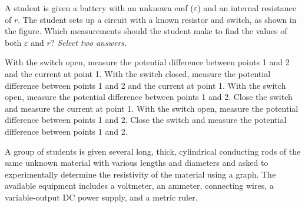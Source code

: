 \documentclass{../../oss-apphys-exam}
\begin{document}
\begin{questions}
  \question A student is given a battery with an unknown emf ($\varepsilon$)
  and an internal resistance of $r$. The student sets up a circuit with a known
  resistor and switch, as shown in the figure. Which measurements should the
  student make to find the values of both $\varepsilon$ and $r$?
  \emph{Select two answers.}
  \begin{choices}
    \choice With the switch open, measure the potential difference between
    points 1 and 2 and the current at point 1.
    \choice With the switch closed, measure the potential difference between
    points 1 and 2 and the current at point 1.
    \choice With the switch open, measure the potential difference between
    points 1 and 2. Close the switch and measure the current at point 1.
    \choice With the switch open, measure the potential difference between
    points 1 and 2. Close the switch and measure the potential difference
    between points 1 and 2.
  \end{choices}
  \newpage

  \fullwidth{
    \classkickFRQinstructions
  }
  

  \question A group of students is given several long, thick, cylindrical
  conducting rods of the same unknown material with various lengths and
  diameters and asked to experimentally determine the resistivity of the
  material using a graph. The available equipment includes a voltmeter, an
  ammeter, connecting wires, a variable-output DC power supply, and a metric
  ruler.
\end{questions}
\end{document}
